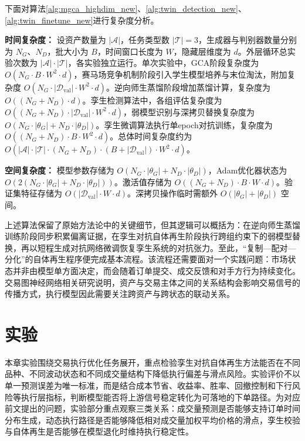 下面对算法\ref{alg:mgca_highdim_new}、\ref{alg:twin_detection_new}、\ref{alg:twin_finetune_new}进行复杂度分析。

\textbf{时间复杂度：} 设资产数量为 $|\mathcal{A}|$，任务类型数 $|\mathcal{T}|=3$，生成器与判别器数量分别为 $N_G$、$N_D$，批大小为 $B$，时间窗口长度为 $W$，隐藏层维度为 $d$。外层循环总实验次数为 $|\mathcal{A}| \cdot |\mathcal{T}|$，各实验独立运行。单次实验中，GCA阶段复杂度为 $O(N_G \cdot B \cdot W^2 \cdot d)$，赛马场竞争机制阶段引入学生模型培养与末位淘汰，附加复杂度 $O(N_G \cdot |\mathcal{D}_{\text{val}}| \cdot W^2 \cdot d)$。逆向师生蒸馏阶段增加蒸馏计算，复杂度为 $O((N_G+N_D) \cdot d)$。孪生检测算法中，各组评估复杂度为 $O((N_G+N_D) \cdot |\mathcal{D}_{\text{val}}| \cdot W^2 \cdot d)$，弱模型识别与深拷贝替换复杂度为 $O(N_G \cdot |\theta_G| + N_D \cdot |\theta_D|)$。孪生微调算法执行单epoch对抗训练，复杂度为 $O((N_G+N_D) \cdot B \cdot W^2 \cdot d)$。总体时间复杂度约为 $O(|\mathcal{A}| \cdot |\mathcal{T}| \cdot (N_G+N_D) \cdot (B + |\mathcal{D}_{\text{val}}|) \cdot W^2 \cdot d)$。

\textbf{空间复杂度：} 模型参数存储为 $O(N_G \cdot |\theta_G| + N_D \cdot |\theta_D|)$，Adam优化器状态为 $O(2(N_G \cdot |\theta_G| + N_D \cdot |\theta_D|))$。激活值存储为 $O((N_G+N_D) \cdot B \cdot W \cdot d)$。验证集特征存储为 $O(|\mathcal{D}_{\text{val}}| \cdot W \cdot d)$。深拷贝操作临时需额外 $O(|\theta_G| + |\theta_D|)$ 空间。

上述算法保留了原始方法论中的关键细节，但其逻辑可以概括为：在逆向师生蒸馏训练阶段同步积累偏离证据，在孪生对抗自体再生阶段执行跨组约束下的弱模型替换，再以短程生成对抗网络微调恢复孪生系统的对抗张力。至此，“复制—配对—分化”的自体再生程序便完成基本流程。该流程还需要面对一个实践问题：市场状态并非由模型单方面决定，而会随着订单提交、成交反馈和对手方行为持续变化。交易图神经网络相关研究说明，资产与交易主体之间的关系结构会影响交易信号的传播方式，执行模型因此需要关注跨资产与跨状态的联动关系\cite{wu2025tgnn}。

\section{实验}

本章实验围绕交易执行优化任务展开，重点检验孪生对抗自体再生方法能否在不同品种、不同波动状态和不同成交量结构下降低执行偏差与滑点风险。实验评价不以单一预测误差为唯一标准，而是结合成本节省、收益率、胜率、回撤控制和下行风险等执行层指标，判断模型能否将上游信号稳定转化为可落地的下单路径。为对应前文提出的问题，实验部分重点观察三类关系：成交量预测是否能够支持订单时间分布生成，动态执行路径是否能够降低相对成交量加权平均价格的滑点，孪生校验与自体再生是否能够在模型退化时维持执行稳定性。

